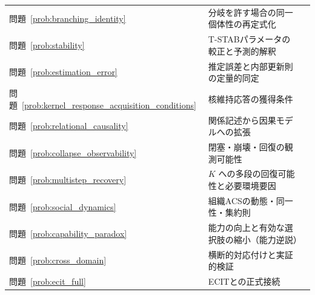 \begingroup
\small
\setlength{\tabcolsep}{4pt}
\renewcommand{\arraystretch}{1.12}
\begin{longtable}{p{2.4cm} p{10.4cm} r}
問題~\ref{prob:branching_identity} & 分岐を許す場合の同一個体性の再定式化 & \pageref{prob:branching_identity} \\
問題~\ref{prob:stability} & T-STABパラメータの較正と予測的解釈 & \pageref{prob:stability} \\
問題~\ref{prob:estimation_error} & 推定誤差と内部更新則の定量的同定 & \pageref{prob:estimation_error} \\
問題~\ref{prob:kernel_response_acquisition_conditions} & 核維持応答の獲得条件 & \pageref{prob:kernel_response_acquisition_conditions} \\
問題~\ref{prob:relational_causality} & 関係記述から因果モデルへの拡張 & \pageref{prob:relational_causality} \\
問題~\ref{prob:collapse_observability} & 閉塞・崩壊・回復の観測可能性 & \pageref{prob:collapse_observability} \\
問題~\ref{prob:multistep_recovery} & $K$ への多段の回復可能性と必要環境要因 & \pageref{prob:multistep_recovery} \\
問題~\ref{prob:social_dynamics} & 組織ACSの動態・同一性・集約則 & \pageref{prob:social_dynamics} \\
問題~\ref{prob:capability_paradox} & 能力の向上と有効な選択肢の縮小（能力逆説） & \pageref{prob:capability_paradox} \\
問題~\ref{prob:cross_domain} & 横断的対応付けと実証的検証 & \pageref{prob:cross_domain} \\
問題~\ref{prob:ecit_full} & ECITとの正式接続 & \pageref{prob:ecit_full} \\
\end{longtable}
\endgroup
